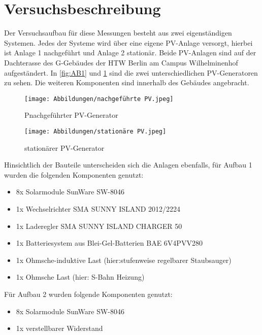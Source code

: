 \section{Versuchsbeschreibung}
\label{section:Versuchsbeschreibung}
Der Versuchsaufbau für diese Messungen besteht aus zwei eigenständigen Systemen.
Jedes der Systeme wird über eine eigene PV-Anlage versorgt, hierbei ist Anlage 1 nachgeführt und Anlage 2 stationär. Beide PV-Anlagen sind auf
der Dachterasse des G-Gebäudes der HTW Berlin am Campus Wilhelminenhof aufgeständert.
In \ref*{fig:AB1} und \ref*{fig:AB2} sind die zwei unterschiedlichen PV-Generatoren
zu sehen. Die weiteren Komponenten sind innerhalb des Gebäudes angebracht.\\
%
\begin{figure}[H]
	\centering
	\begin{minipage}{0.49\textwidth}
		\centering
		\texttt{[image: Abbildungen/nachgeführte PV.jpeg]}
		\caption{Pnachgeführter PV-Generator}	
		\label{fig:AB1}
	\end{minipage}
	\hfill
\begin{minipage}{0.49\textwidth}
	\centering
	\texttt{[image: Abbildungen/stationäre PV.jpeg]}
	\caption{stationärer PV-Generator}
	\label{fig:AB2}
\end{minipage}
\end{figure}
%
Hinsichtlich der Bauteile unterscheiden sich die Anlagen ebenfalls, für Aufbau 1 
wurden die folgenden Komponenten genutzt:
\begin{itemize}
	\item 8x Solarmodule SunWare SW-8046 
	\item 1x Wechselrichter SMA SUNNY ISLAND 2012/2224 
	\item 1x Laderegler SMA SUNNY ISLAND CHARGER 50 
	\item 1x Batteriesystem aus Blei-Gel-Batterien BAE 6V4PVV280
	\item 1x Ohmsche-induktive Last (hier:stufenweise regelbarer Staubsauger)
	\item 1x Ohmsche Last (hier: S-Bahn Heizung)
\end{itemize}

Für Aufbau 2 wurden folgende Komponenten genutzt:
\begin{itemize}
	\item 8x Solarmodule SunWare SW-8046 
	\item 1x verstellbarer Widerstand
\end{itemize}
